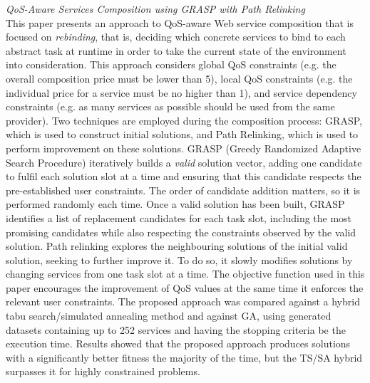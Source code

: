 \textit{QoS-Aware Services Composition using GRASP with Path Relinking \cite{parejo2014qos}}\\
This paper presents an approach to QoS-aware Web service composition that is focused on \textit{rebinding}, that is, deciding which concrete services to bind to each abstract task at runtime in order to take the current state of the environment into consideration. This approach considers global QoS constraints (e.g. the overall composition price must be lower than 5), local QoS constraints (e.g. the individual price for a service must be no higher than 1), and service dependency constraints (e.g. as many services as possible should be used from the same provider). Two techniques are employed during the composition process: GRASP, which is used to construct initial solutions, and Path Relinking, which is used to perform improvement on these solutions. GRASP (Greedy Randomized Adaptive Search Procedure) iteratively builds a \textit{valid} solution vector, adding one candidate to fulfil each solution
slot at a time and ensuring that this candidate respects the pre-established user constraints. The order of candidate addition matters, so it is performed randomly each time. Once a
valid solution has been built, GRASP identifies a list of replacement candidates for each task slot, including the most promising candidates while also respecting the constraints observed by the valid solution. Path relinking explores the neighbouring solutions of the initial valid solution, seeking to further improve it. To do so, it slowly modifies solutions by changing services from one task slot at a time. The objective function used in this paper encourages the improvement of QoS values at the same time it enforces the relevant user constraints. The proposed approach was compared against a hybrid tabu search/simulated annealing method and against GA, using generated datasets containing up to 252 services and having the stopping criteria be the execution time. Results showed that the proposed approach produces solutions with a significantly better fitness the majority of the time, but
the TS/SA hybrid surpasses it for highly constrained problems.


